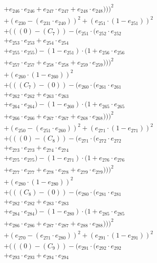 \documentclass[10pt, a4paper]{article}
\begin{document}
\begin{align*}
& + e_{246} \cdot e_{246} + e_{247} \cdot e_{247} + e_{248} \cdot e_{248})))^{2} \\
& + (e_{230} - (e_{231} \cdot e_{240}))^{2} + (e_{251} \cdot (1 - e_{251}))^{2} \\
& + (((0) - (C_{7})) - (e_{251} \cdot (e_{252} \cdot e_{252} \\
& + e_{253} \cdot e_{253} + e_{254} \cdot e_{254} \\
& + e_{255} \cdot e_{255}) - (1 - e_{251}) \cdot (1 + e_{256} \cdot e_{256} \\
& + e_{257} \cdot e_{257} + e_{258} \cdot e_{258} + e_{259} \cdot e_{259})))^{2} \\
& + (e_{260} \cdot (1 - e_{260}))^{2} \\
& + (((C_{7}) - (0)) - (e_{260} \cdot (e_{261} \cdot e_{261} \\
& + e_{262} \cdot e_{262} + e_{263} \cdot e_{263} \\
& + e_{264} \cdot e_{264}) - (1 - e_{260}) \cdot (1 + e_{265} \cdot e_{265} \\
& + e_{266} \cdot e_{266} + e_{267} \cdot e_{267} + e_{268} \cdot e_{268})))^{2} \\
& + (e_{250} - (e_{251} \cdot e_{260}))^{2} + (e_{271} \cdot (1 - e_{271}))^{2} \\
& + (((0) - (C_{8})) - (e_{271} \cdot (e_{272} \cdot e_{272} \\
& + e_{273} \cdot e_{273} + e_{274} \cdot e_{274} \\
& + e_{275} \cdot e_{275}) - (1 - e_{271}) \cdot (1 + e_{276} \cdot e_{276} \\
& + e_{277} \cdot e_{277} + e_{278} \cdot e_{278} + e_{279} \cdot e_{279})))^{2} \\
& + (e_{280} \cdot (1 - e_{280}))^{2} \\
& + (((C_{8}) - (0)) - (e_{280} \cdot (e_{281} \cdot e_{281} \\
& + e_{282} \cdot e_{282} + e_{283} \cdot e_{283} \\
& + e_{284} \cdot e_{284}) - (1 - e_{280}) \cdot (1 + e_{285} \cdot e_{285} \\
& + e_{286} \cdot e_{286} + e_{287} \cdot e_{287} + e_{288} \cdot e_{288})))^{2} \\
& + (e_{270} - (e_{271} \cdot e_{280}))^{2} + (e_{291} \cdot (1 - e_{291}))^{2} \\
& + (((0) - (C_{9})) - (e_{291} \cdot (e_{292} \cdot e_{292} \\
& + e_{293} \cdot e_{293} + e_{294} \cdot e_{294} \\

\end{align*}
\end{document}
